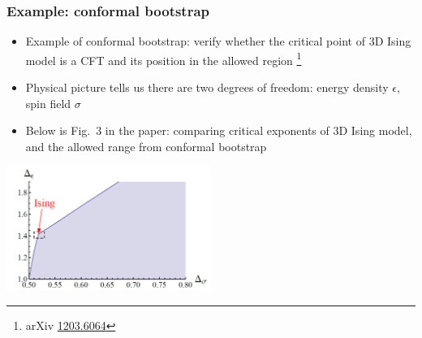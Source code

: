 \documentclass{beamer}
\begin{document}
\begin{frame}
\frametitle{Example: conformal bootstrap}

\begin{itemize}
    \item Example of conformal bootstrap: verify whether the critical point of 3D Ising model 
    is a CFT and its position in the allowed region \footnote{arXiv \href{https://arxiv.org/abs/1203.6064}{1203.6064}}
    \item Physical picture tells us there are two degrees of freedom: energy density $\epsilon$, spin field $\sigma$
    \item Below is Fig.~3 in the paper: comparing critical exponents of 3D Ising model, and the allowed range from conformal bootstrap
\end{itemize}

\begin{center}
    \includegraphics[width=0.5\textwidth]{3d-ising-cft-bootstrap-range.PNG}
\end{center}

\end{frame}
\end{document}
